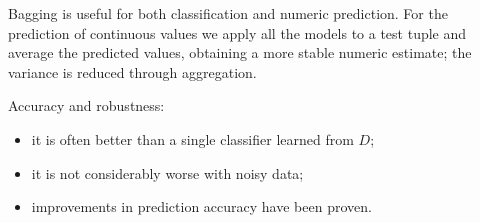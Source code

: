\begin{center}
\end{center}

Bagging is useful for both classification and numeric prediction. For the prediction of continuous values we apply all the models to a test tuple and average the predicted values, obtaining a more stable numeric estimate; the variance is reduced through aggregation.

Accuracy and robustness:
\begin{itemize}
    \item it is often better than a single classifier learned from $D$;
    \item it is not considerably worse with noisy data;
    \item improvements in prediction accuracy have been proven.
\end{itemize}
